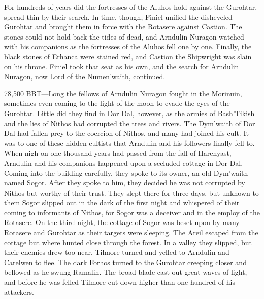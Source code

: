 \documentclass[smalldemyvopaper,11pt,twoside,onecolumn,openright,extrafontsizes]{memoir}
\begin{document}
	For hundreds of years did the fortresses of the Aluhos hold against the Gurohtar, spread thin by their search. In time, though, Finiel unified the disheveled Gurohtar and brought them in force with the Rotasere against Castion. The stones could not hold back the tides of dead, and Arndulin Nuragon watched with his companions as the fortresses of the Aluhos fell one by one. Finally, the black stones of Erhanca were stained red, and Castion the Shipwright was slain on his throne. Finiel took that seat as his own, and the search for Arndulin Nuragon, now Lord of the Numen’waith, continued.

78,500 BBT—Long the fellows of Arndulin Nuragon fought in the Morinuin, sometimes even coming to the light of the moon to evade the eyes of the Gurohtar. Little did they find in Dor Dal, however, as the armies of Bash’Tikish and the lies of Nithos had corrupted the trees and rivers. The Dym’waith of Dor Dal had fallen prey to the coercion of Nithos, and many had joined his cult. It was to one of these hidden cultists that Arndulin and his followers finally fell to.
	When nigh on one thousand years had passed from the fall of Harenyast, Arndulin and his companions happened upon a secluded cottage in Dor Dal. Coming into the building carefully, they spoke to its owner, an old Dym’waith named Sogor. After they spoke to him, they decided he was not corrupted by Nithos but worthy of their trust. They slept there for three days, but unknown to them Sogor slipped out in the dark of the first night and whispered of their coming to informants of Nithos, for Sogor was a deceiver and in the employ of the Rotasere. On the third night, the cottage of Sogor was beset upon by many Rotasere and Gurohtar as their targets were sleeping. The Areil escaped from the cottage but where hunted close through the forest. In a valley they slipped, but their enemies drew too near. Tilmore turned and yelled to Arndulin and Carelwen to flee. The dark Forhos turned to the Gurohtar creeping closer and bellowed as he swung Ramalin. The broad blade cast out great waves of light, and before he was felled Tilmore cut down higher than one hundred of his attackers.
\end{document}
